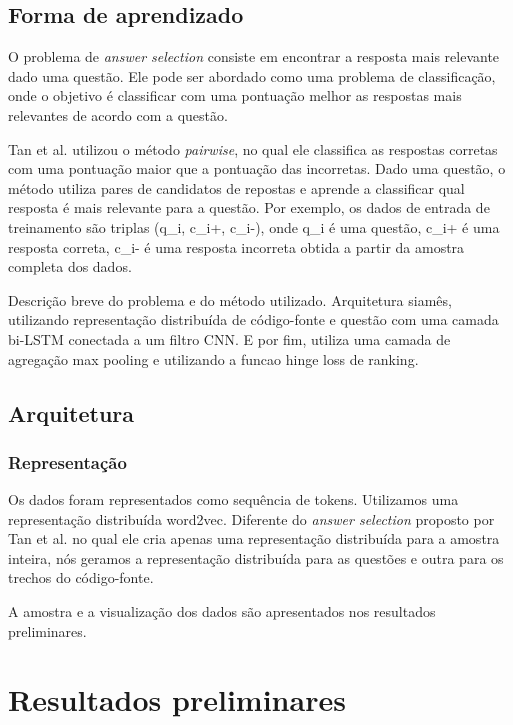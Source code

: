 \documentclass[12pt]{article}
\begin{document}
\subsection{Forma de aprendizado}

O problema de \textit{answer selection} consiste em encontrar a resposta mais relevante dado uma questão. Ele pode ser abordado como uma problema de classificação, onde
o objetivo é classificar com uma pontuação melhor as respostas mais relevantes de acordo com a questão.

Tan et al. utilizou o método \textit{pairwise}, no qual ele classifica as respostas corretas com uma pontuação maior que a pontuação das incorretas. Dado uma questão,
o método utiliza pares de candidatos de repostas e aprende a classificar qual resposta é mais relevante para a questão. Por exemplo, os dados de entrada de treinamento
são triplas (q\_i, c\_i+, c\_i-), onde q\_i é uma questão, c\_i+ é uma resposta correta, c\_i- é uma resposta incorreta obtida a partir da amostra completa dos dados. 


 
Descrição breve do problema e do método utilizado. Arquitetura siamês, utilizando representação distribuída de código-fonte e questão com uma camada bi-LSTM conectada a um filtro CNN. E por fim, utiliza uma camada de agregação max pooling e utilizando a funcao hinge loss de ranking.

\subsection{Arquitetura}

\subsubsection{Representação}
Os dados foram representados como sequência de tokens. Utilizamos uma representação distribuída word2vec. Diferente do \textit{answer selection} proposto por Tan et al. no qual ele cria apenas uma representação distribuída para a amostra inteira, nós geramos a representação distribuída para as questões e outra para os trechos do código-fonte.

A amostra e a visualização dos dados são apresentados nos resultados preliminares.






\section{Resultados preliminares}\label{sec:resultados-preliminares}
\end{document}
